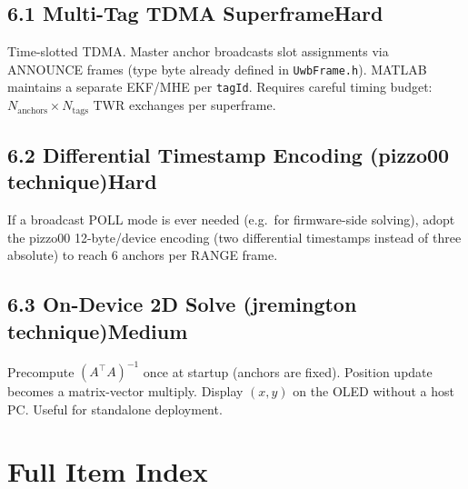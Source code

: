 \documentclass[11pt,a4paper]{article}
\newcommand{\dif}[1]{\texorpdfstring{\hfill#1}{}}
\newcommand{\medium}{\textcolor{dkorange}{\textbf{Medium}}}
\newcommand{\hard}{\textcolor{dkred}{\textbf{Hard}}}
\begin{document}
\subsection{6.1 Multi-Tag TDMA Superframe\dif{\hard}}
Time-slotted TDMA. Master anchor broadcasts slot assignments via ANNOUNCE frames (type byte already defined in \texttt{UwbFrame.h}). MATLAB maintains a separate EKF/MHE per \texttt{tagId}. Requires careful timing budget: $N_\text{anchors} \times N_\text{tags}$ TWR exchanges per superframe.

\subsection{6.2 Differential Timestamp Encoding (pizzo00 technique)\dif{\hard}}
If a broadcast POLL mode is ever needed (e.g.\ for firmware-side solving), adopt the pizzo00 12-byte/device encoding (two differential timestamps instead of three absolute) to reach 6 anchors per RANGE frame.

\subsection{6.3 On-Device 2D Solve (jremington technique)\dif{\medium}}
Precompute $(A^\top A)^{-1}$ once at startup (anchors are fixed). Position update becomes a matrix-vector multiply. Display $(x, y)$ on the OLED without a host PC. Useful for standalone deployment.

\section{Full Item Index}
\end{document}
